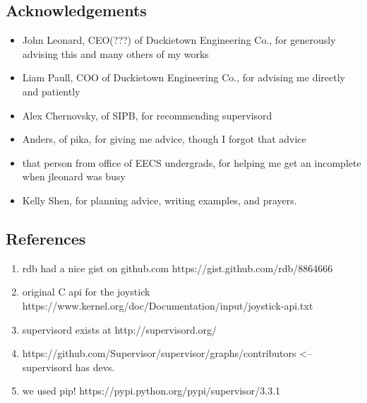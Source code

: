 \documentclass[titlepage]{article}
\begin{document}
\subsection{Acknowledgements}
\begin{itemize}
\item John Leonard, CEO(???) of Duckietown Engineering Co., for generously advising this and many others of my works
\item Liam Paull, COO of Duckietown Engineering Co., for advising me directly and patiently
\item Alex Chernovsky, of SIPB, for recommending supervisord
\item Anders, of pika, for giving me advice, though I forgot that advice
\item that person from office of EECS undergrads, for helping me get an incomplete when jleonard was busy
\item Kelly Shen, for planning advice, writing examples, and prayers. 
\end{itemize}

\subsection{References}
\begin{enumerate}[(1)]
\item rdb had a nice gist on github.com https://gist.github.com/rdb/8864666
\item original C api for the joystick https://www.kernel.org/doc/Documentation/input/joystick-api.txt
\item supervisord exists at http://supervisord.org/
\item https://github.com/Supervisor/supervisor/graphs/contributors <-- supervisord has devs.
\item we used pip! https://pypi.python.org/pypi/supervisor/3.3.1
\end{enumerate}
\end{document}
